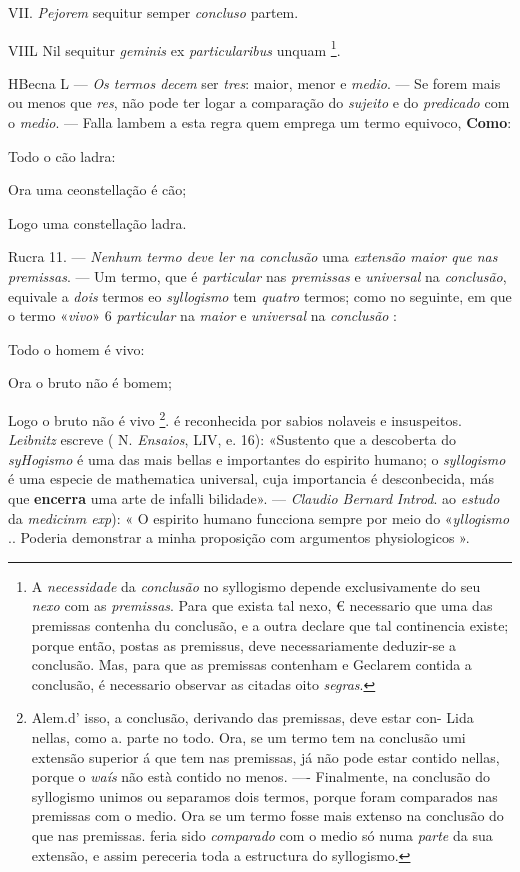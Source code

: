 VII. \emph{Pejorem} sequitur semper \emph{concluso} partem.

VIIL Nil sequitur \emph{geminis} ex \emph{particularibus} unquam \footnote{A \emph{necessidade} da \emph{conclusão} no syllogismo depende exclusivamente do seu \emph{nexo} com as \emph{premissas}. Para que exista tal nexo, € necessario que uma das premissas contenha du conclusão, e a outra declare que tal continencia existe; porque então, postas as premissus, deve necessariamente deduzir-se a conclusão. Mas, para que as premissas contenham e Geclarem contida a conclusão, é necessario observar as citadas oito \emph{segras}.}.

HBecna L --- \emph{Os termos decem} ser \emph{tres}: maior, menor e \emph{medio}. --- Se forem mais ou menos que \emph{res}, não pode ter logar a comparação do \emph{sujeito} e do \emph{predicado} com o \emph{medio}. --- Falla lambem a esta regra quem emprega um termo equivoco, \textbf{Como}:

Todo o cão ladra:

Ora uma ceonstellação é cão;

Logo uma constellação ladra.

Rucra 11. --- \emph{Nenhum termo deve ler na conclusão} uma \emph{extensão maior que nas premissas}. --- Um termo, que é \emph{particular} nas \emph{premissas} e \emph{universal} na \emph{conclusão}, equivale a \emph{dois} termos eo \emph{syllogismo} tem \emph{quatro} termos; como no seguinte, em que o termo «\emph{vivo}» 6 \emph{particular} na \emph{maior} e \emph{universal} na \emph{conclusão} :

Todo o homem é vivo:

Ora o bruto não é bomem;

Logo o bruto não é vivo \footnote{Alem.d' isso, a conclusão, derivando das premissas, deve estar con- Lida nellas, como a. parte no todo. Ora, se um termo tem na conclusão umi extensão superior á que tem nas premissas, já não pode estar contido nellas, porque o \emph{waís} não està contido no menos. ---- Finalmente, na conclusão do syllogismo unimos ou separamos dois termos, porque foram comparados nas premissas com o medio. Ora se um termo fosse mais extenso na conclusão do que nas premissas. feria sido \emph{comparado} com o medio só numa \emph{parte} da sua extensão, e assim pereceria toda a estructura do syllogismo.}. é reconhecida por sabios nolaveis e insuspeitos. \emph{Leibnitz} escreve ( N. \emph{Ensaios}, LIV, e. 16): «Sustento que a descoberta do \emph{syHogismo} é uma das mais bellas e importantes do espirito humano; o \emph{syllogismo} é uma especie de mathematica universal, cuja importancia é desconbecida, más que \textbf{encerra} uma arte de infalli bilidade». --- \emph{Claudio Bernard} \textbar{} \emph{Introd}. ao \emph{estudo} da \emph{medicinm exp}): « O espirito humano funcciona sempre por meio do «\emph{yllogismo} .. Poderia demonstrar a minha proposição com argumentos physiologicos ».

